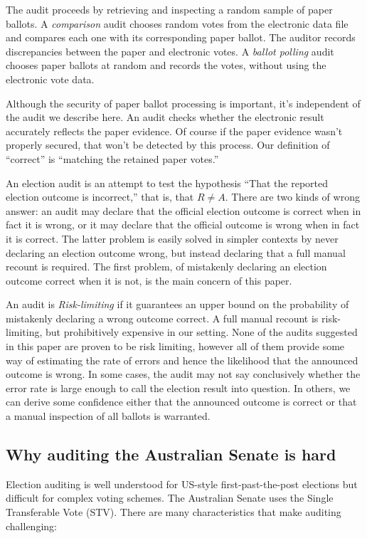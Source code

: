 \documentclass[10pt,a4paper]{article}
\begin{document}
The audit proceeds by retrieving and inspecting a random sample of paper ballots.  A \emph{comparison} audit chooses random votes from the electronic data file and compares each one with its corresponding paper ballot. The auditor records discrepancies between the paper and electronic votes.  A \emph{ballot polling} audit chooses paper ballots at random and records the votes, without using the electronic vote data.  

Although the security of paper ballot processing is important, it's independent of the audit we describe here.  An audit checks whether the electronic result accurately reflects the paper evidence.  Of course if the paper evidence wasn't properly secured, that won't be detected by this process.  Our definition of ``correct'' is ``matching the retained paper votes.''

An election audit is an attempt to test the hypothesis ``That the reported election outcome is incorrect,'' that is, that $R \neq A$.  There are two kinds of wrong answer: an audit may declare that the official election outcome is correct when in fact it is wrong, or it may declare that the official outcome is wrong when in fact it is correct.  The latter problem is easily solved in simpler contexts by never declaring an election outcome wrong, but instead declaring that a full manual recount is required.  The first problem, of mistakenly declaring an election outcome correct when it is not, is the main concern of this paper.

An audit is \emph{Risk-limiting} \cite{lindemanStark12} if it guarantees an upper bound on the probability of mistakenly declaring a wrong outcome correct.  A full manual recount is risk-limiting, but prohibitively expensive in our setting.  None of the audits suggested in this paper are proven to be risk limiting, however all of them provide some way of estimating the rate of errors and hence the likelihood that the announced outcome is wrong.  In some cases, the audit may not say conclusively whether the error rate is large enough to call the election result into question.  In others, we can derive some confidence either that the announced outcome is correct or that a manual inspection of all ballots is warranted.


\subsection{Why auditing the Australian Senate is hard}

Election auditing is well understood for US-style first-past-the-post elections but difficult for complex voting schemes.  The Australian Senate uses the Single Transferable Vote (STV).  
There are many characteristics that make auditing challenging:
\end{document}
